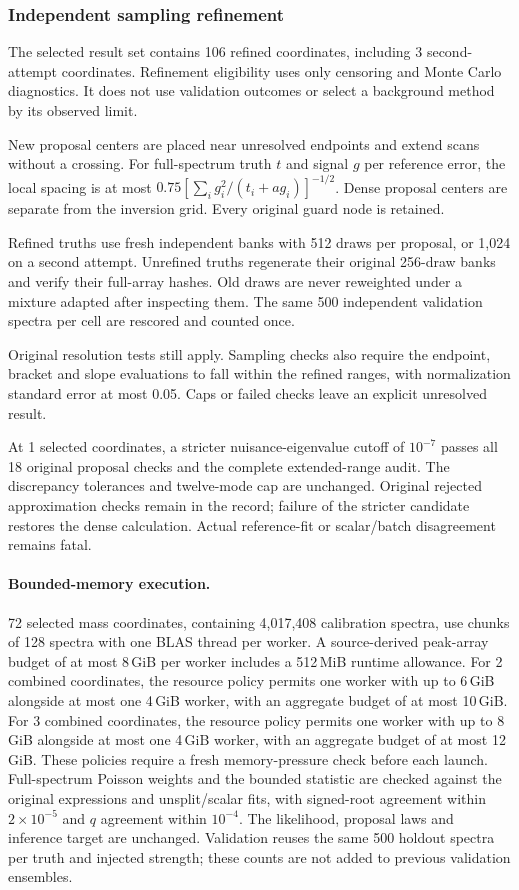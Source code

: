 \subsubsection{Independent sampling refinement}

The selected result set contains 106 refined coordinates, including 3 second-attempt coordinates. Refinement eligibility uses only censoring and Monte Carlo diagnostics. It does not use validation outcomes or select a background method by its observed limit.

New proposal centers are placed near unresolved endpoints and extend scans without a crossing. For full-spectrum truth $t$ and signal $g$ per reference error, the local spacing is at most $0.75[\sum_i g_i^2/(t_i+a g_i)]^{-1/2}$. Dense proposal centers are separate from the inversion grid. Every original guard node is retained.

Refined truths use fresh independent banks with 512 draws per proposal, or 1,024 on a second attempt. Unrefined truths regenerate their original 256-draw banks and verify their full-array hashes. Old draws are never reweighted under a mixture adapted after inspecting them. The same 500 independent validation spectra per cell are rescored and counted once.

Original resolution tests still apply. Sampling checks also require the endpoint, bracket and slope evaluations to fall within the refined ranges, with normalization standard error at most 0.05. Caps or failed checks leave an explicit unresolved result.

At 1 selected coordinates, a stricter nuisance-eigenvalue cutoff of $10^{-7}$ passes all 18 original proposal checks and the complete extended-range audit. The discrepancy tolerances and twelve-mode cap are unchanged. Original rejected approximation checks remain in the record; failure of the stricter candidate restores the dense calculation. Actual reference-fit or scalar/batch disagreement remains fatal.

\paragraph{Bounded-memory execution.} 72 selected mass coordinates, containing 4,017,408 calibration spectra, use chunks of 128 spectra with one BLAS thread per worker. A source-derived peak-array budget of at most 8\,GiB per worker includes a 512\,MiB runtime allowance. For 2 combined coordinates, the resource policy permits one worker with up to 6\,GiB alongside at most one 4\,GiB worker, with an aggregate budget of at most 10\,GiB. For 3 combined coordinates, the resource policy permits one worker with up to 8\,GiB alongside at most one 4\,GiB worker, with an aggregate budget of at most 12\,GiB. These policies require a fresh memory-pressure check before each launch. Full-spectrum Poisson weights and the bounded statistic are checked against the original expressions and unsplit/scalar fits, with signed-root agreement within $2\times10^{-5}$ and $q$ agreement within $10^{-4}$. The likelihood, proposal laws and inference target are unchanged. Validation reuses the same 500 holdout spectra per truth and injected strength; these counts are not added to previous validation ensembles.

